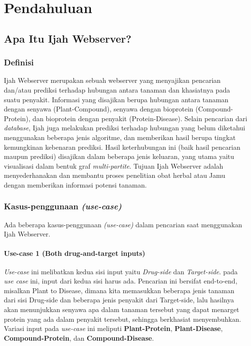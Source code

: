 \chapter{Pendahuluan}

\section{Apa Itu Ijah Webserver?}

	\subsection{Definisi}
	Ijah Webserver merupakan sebuah webserver yang menyajikan pencarian dan/atau prediksi terhadap hubungan antara tanaman dan khasiatnya pada suatu penyakit. Informasi yang disajikan berupa hubungan antara tanaman dengan senyawa (Plant-Compound), senyawa dengan bioprotein (Compound-Protein), dan bioprotein dengan penyakit (Protein-Disease). Selain pencarian dari \emph{database}, Ijah juga melakukan prediksi terhadap hubungan yang belum diketahui menggunakan beberapa jenis algoritme, dan memberikan hasil berupa tingkat kemungkinan kebenaran prediksi. Hasil keterhubungan ini (baik hasil pencarian maupun prediksi) disajikan dalam beberapa jenis keluaran, yang utama yaitu visualisasi dalam bentuk graf \emph{multi-partite}. Tujuan Ijah Webserver adalah menyederhanakan dan membantu proses penelitian obat herbal atau Jamu dengan memberikan informasi potensi tanaman.

	\subsection{Kasus-penggunaan \emph{(use-case)}}
	Ada beberapa kasus-penggunaan \emph{(use-case)} dalam pencarian saat menggunakan Ijah Webserver.
		\subsubsection{Use-case 1 (Both drug-and-target inputs)} \label{sssec:end to end}
		\emph{Use-case} ini melibatkan kedua sisi input yaitu \emph{Drug-side} dan \emph{Target-side}. pada \emph{use case} ini, input dari kedua sisi harus ada. Pencarian ini bersifat end-to-end, misalkan Plant to Disease, dimana kita memasukkan beberapa jenis tanaman dari sisi Drug-side dan beberapa jenis penyakit dari Target-side, lalu hasilnya akan menunjukkan senyawa apa dalam tanaman tersebut yang dapat menarget protein yang ada dalam penyakit tersebut, sehingga berkhasiat menyembuhkan. Variasi input pada \emph{use-case} ini meliputi \textbf{Plant-Protein}, \textbf{Plant-Disease}, \textbf{Compound-Protein}, dan \textbf{Compound-Disease}.
